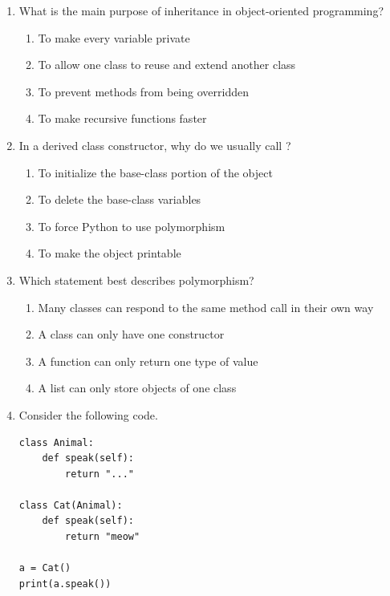 \documentclass[11pt]{article}
\newcommand{\code}[1]{\texttt{\detokenize{#1}}}
\begin{document}
\begin{enumerate}[label=\arabic*.]
    \item What is the main purpose of inheritance in object-oriented programming?
    \begin{enumerate}[label=\alph*)]
        \item To make every variable private
        \item To allow one class to reuse and extend another class
        \item To prevent methods from being overridden
        \item To make recursive functions faster
    \end{enumerate}

    \item In a derived class constructor, why do we usually call \code{super().__init__(...)}?
    \begin{enumerate}[label=\alph*)]
        \item To initialize the base-class portion of the object
        \item To delete the base-class variables
        \item To force Python to use polymorphism
        \item To make the object printable
    \end{enumerate}

    \item Which statement best describes polymorphism?
    \begin{enumerate}[label=\alph*)]
        \item Many classes can respond to the same method call in their own way
        \item A class can only have one constructor
        \item A function can only return one type of value
        \item A list can only store objects of one class
    \end{enumerate}

    \newpage

    \item Consider the following code.

\begin{verbatim}
class Animal:
    def speak(self):
        return "..."

class Cat(Animal):
    def speak(self):
        return "meow"

a = Cat()
print(a.speak())
\end{verbatim}


\end{enumerate}
\end{document}
